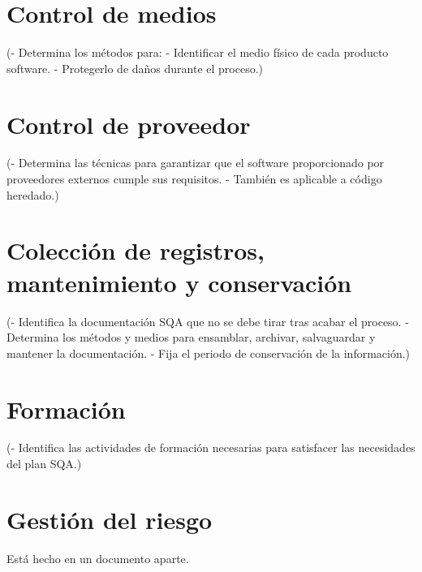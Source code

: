 \documentclass[spanish,a4paper,11pt, twoside]{report}	%
\begin{document}
\chapter{ Control de medios}
	(- Determina los métodos para:
	- Identificar el medio físico de cada producto software.
	- Protegerlo de daños durante el proceso.)

\newpage
\mbox{}
\thispagestyle{empty}						%
\newpage

\chapter{ Control de proveedor}
	(- Determina las técnicas para garantizar que el
	software proporcionado por proveedores externos
	cumple sus requisitos.
	- También es aplicable a código heredado.)

\newpage
\mbox{}
\thispagestyle{empty}						%
\newpage

\chapter{ Colección de registros, mantenimiento y conservación}
	(- Identifica la documentación SQA que no se debe
	tirar tras acabar el proceso.
	- Determina los métodos y medios para ensamblar,
	archivar, salvaguardar y mantener la documentación.
	- Fija el periodo de conservación de la información.)

\newpage
\mbox{}
\thispagestyle{empty}						%
\newpage

\chapter{ \hspace{0.25cm}Formación}
	(- Identifica las actividades de formación necesarias
	para satisfacer las necesidades del plan SQA.)

\newpage
\mbox{}
\thispagestyle{empty}						%
\newpage

\chapter{ \hspace{0.25cm}Gestión del riesgo}
	Está hecho en un documento aparte.

\end{document}
